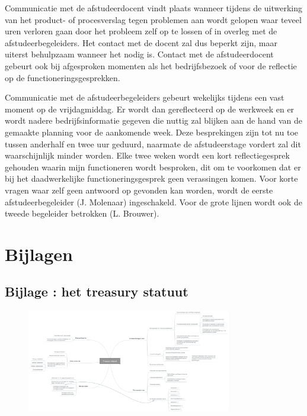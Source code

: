 \documentclass[10pt,a4paper,oneside]{report}
\newcounter{bijlage}[section] %
\begin{document}
Communicatie met de afstudeerdocent vindt plaats wanneer tijdens de uitwerking van het product- of procesverslag tegen problemen aan wordt gelopen waar teveel uren verloren gaan door het probleem zelf op te lossen of in overleg met de afstudeerbegeleiders. Het contact met de docent zal dus beperkt zijn, maar uiterst behulpzaam wanneer het nodig is. Contact met de afstudeerdocent gebeurt ook bij afgesproken momenten als het bedrijfsbezoek of voor de reflectie op de functioneringsgesprekken.

Communicatie met de afstudeerbegeleiders gebeurt wekelijks tijdens een vast moment op de vrijdagmiddag. Er wordt dan gereflecteerd op de werkweek en er wordt nadere bedrijfsinformatie gegeven die nuttig zal blijken aan de hand van de gemaakte planning voor de aankomende week. Deze besprekingen zijn tot nu toe tussen anderhalf en twee uur geduurd, naarmate de afstudeerstage vordert zal dit waarschijnlijk minder worden. Elke twee weken wordt een kort reflectiegesprek gehouden waarin mijn functioneren wordt besproken, dit om te voorkomen dat er bij het daadwerkelijke functioneringsgesprek geen verassingen komen. Voor korte vragen waar zelf geen antwoord op gevonden kan worden, wordt de eerste afstudeerbegeleider (J. Molenaar) ingeschakeld. Voor de grote lijnen wordt ook de tweede begeleider betrokken (L. Brouwer).


\printbibliography
{}

\newpage
\section*{Bijlagen}

\subsection*{\hypertarget{bij:treasury}{Bijlage \thebijlage}: het treasury statuut}
\begin{figure}[!h]
    \centering
    \includegraphics[angle=-90,width=0.795\textwidth]{treasury}
    \label{fig:mmtreasury}
\end{figure}
\end{document}
